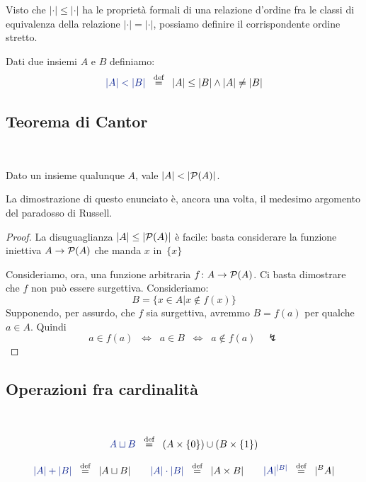 Visto che $|\cdot|\leq|\cdot|$ ha le propriet\`a formali di una relazione d'ordine fra le classi di equivalenza della relazione $|\cdot| = |\cdot|$, possiamo definire il corrispondente ordine stretto.

\begin{definition}
	Dati due insiemi $A$ e $B$ definiamo:
	\[ {\drkblu |A| < |B|} \;\;\Mydef\;\; |A| \leq |B| \land |A| \neq |B| \]
\end{definition}


\subsection{Teorema di Cantor}

\ 

\begin{theorem}[Cantor]
	\label{cantor}
	Dato un insieme qualunque $A$, vale $|A| < |\mathcal{P}(A)|$.
\end{theorem}

{\drkgrn La dimostrazione di questo enunciato \`e, ancora una volta, il
medesimo argomento del paradosso di Russell.}

\begin{proof}
	La disuguaglianza $|A| \leq |\mathcal{P}(A)|$ \`e facile: basta considerare la funzione iniettiva
	$A \to \mathcal{P}(A)$ che manda $x$ in~$\{x\}$

	Consideriamo, ora, una funzione arbitraria $f\colon A \rightarrow \mathcal{P}(A)$.
	Ci basta dimostrare che $f$ non pu\`o essere surgettiva. Consideriamo:
	\[ B = \{x \in A | x \not \in f(x)\} \]
	Supponendo, per assurdo, che $f$ sia surgettiva, avremmo $B = f(a)$
per qualche $a \in A$. Quindi
	\[ a \in f(a) \;\;\iff\;\; a \in B \;\;\iff\;\; a \not \in f(a)
\quad \lightning
		\]
\end{proof}

\subsection{Operazioni fra cardinalit\`a}

\ 

\begin{definition}
	\[ {\drkblu A \sqcup B} \;\;\Mydef\;\; (A \times \{0\}) \cup (B \times
\{1\}) \]
\end{definition}

\begin{definition}
	\[ {\drkblu |A| + |B|} \;\;\Mydef\;\; |A \sqcup B| \qquad {\drkblu |A|\cdot |B|
}\;\;\Mydef\;\; |A \times B| \qquad
		{\drkblu |A|^{|B|}} \;\;\Mydef\;\; |{}^{B}A|
		\]
\end{definition}

